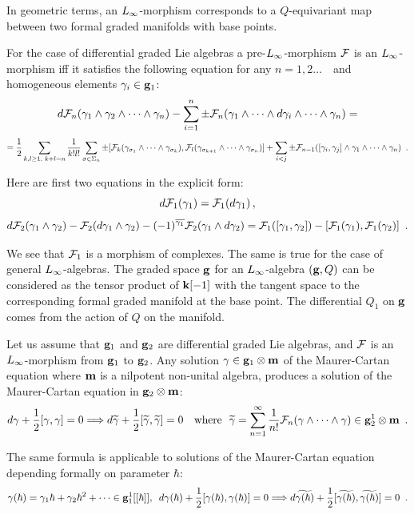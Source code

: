 In geometric terms, an ${L_{\infty}}$-morphism corresponds to a 
 $Q$-equivariant map between two formal graded manifolds
 with base points.
 
 For the case of differential graded Lie algebras  
 a pre-${L_{\infty}}$-morphism ${\cal F}$ is an ${L_{\infty}}$-morphism iff it satisfies
  the following equation for any 
 $n=1,2\dots\,\,\,\,$ and homogeneous elements ${\gamma}_i\in {\bf g}_1$:
$$ d{\cal F}_n({\gamma}_1\wedge {\gamma}_2\wedge\dots\wedge{\gamma}_n)-\sum_{i=1}^n \pm {\cal F}_n(
{\gamma}_1\wedge\dots \wedge d{\gamma}_i\wedge\dots \wedge {\gamma}_n)=$$
$$={1\over 2}\sum_{k,l\ge 1,\,\,k+l=n} {1\over k!l!}\sum_{\sigma\in 
\Sigma_n}
\pm [{\cal F}_k({\gamma}_{\sigma_1}\wedge\dots\wedge{\gamma}_{\sigma_k}),{\cal F}_l({\gamma}_
{\sigma_{k+1}}\wedge
\dots\wedge {\gamma}_{\sigma_n})]+\sum_{i<j}\pm {\cal F}_{n-1}([{\gamma}_i,{\gamma}_j]
\wedge{\gamma}_1
\wedge\dots\wedge{\gamma}_n)\,\,\,.$$

Here are first two equations in the explicit form:
$$d {\cal F}_1({\gamma}_1)={\cal F}_1(d{\gamma}_1)\,,$$
$$d{\cal F}_2({\gamma}_1\wedge{\gamma}_2)-{\cal F}_2(d{\gamma}_1\wedge{\gamma}_2)-(-1)^{\overline{{\gamma}_1}}{\cal F}_2
({\gamma}_1\wedge d{\gamma}_2)=
{\cal F}_1([{\gamma}_1,{\gamma}_2])-[{\cal F}_1({\gamma}_1),{\cal F}_1({\gamma}_2)]\,\,\,.$$

We see that ${\cal F}_1$ is a morphism of complexes. The same is true for
 the case of general ${L_{\infty}}$-algebras. The graded space ${\bf g}$ for 
 an ${L_{\infty}}$-algebra $({\bf g},Q)$ can be considered as the tensor product
 of ${\bf k}[-1]$ with the 
  tangent space 
  to the corresponding formal graded manifold at the base point.
   The differential $Q_1$ on ${\bf g}$ comes from the action of $Q$
  on the manifold.
  
   
      Let us assume that ${\bf g}_1$ and ${\bf g}_2$ are differential graded Lie 
      algebras, and ${\cal F}$ is an ${L_{\infty}}$-morphism from ${\bf g}_1$ to 
      ${\bf g}_2$. Any solution ${\gamma}\in{\bf g}_1\otimes {\bf m}$
      of the Maurer-Cartan equation  
      where ${\bf m}$ is a nilpotent non-unital algebra,
      produces a solution of the Maurer-Cartan equation in ${\bf g}_2\otimes{\bf m}$:
      $$d{\gamma}+{1\over 2}[{\gamma},{\gamma}]=0
      \Longrightarrow
       d\widetilde{{\gamma}}+{1\over 2}
     [\widetilde{{\gamma}},\widetilde{{\gamma}}]=0{\rm{\,\,\,\,\,\,where\,\,\,\,}}
      \widetilde{{\gamma}}=\sum_{n=1}^{\infty} {1\over n!} {\cal F}_n({\gamma}
     \wedge\dots\wedge{\gamma})\in
     {\bf g}_2^1\otimes{\bf m}\,\,\,.$$
      
      The same formula is applicable to solutions of the Maurer-Cartan
       equation depending 
     formally on  parameter $\hbar$:
     $${\gamma}(\hbar)={\gamma}_1\hbar+\gamma_2\hbar^2+\dots\in {\bf g}_1^1[[\hbar]]
     ,\,\,\,d{\gamma}(\hbar)+{1\over 2}
     [{\gamma}(\hbar),{\gamma}(\hbar)]=0\Longrightarrow
      d\widetilde{{\gamma}({\hbar})}+{1\over 2}
     [\widetilde{{\gamma}({\hbar})},\widetilde{{\gamma}({\hbar})}]=0 \,\,\,.$$
      
